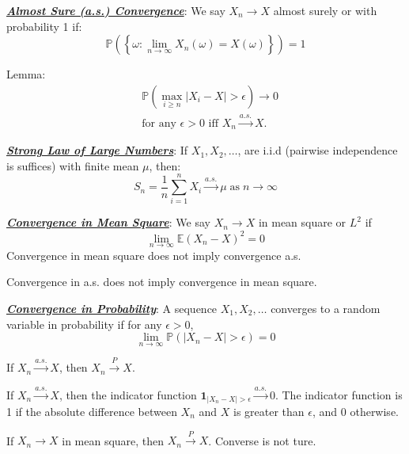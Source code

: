 \documentclass[12pt]{article}
\newcommand{\bulletPoint}[1]{\ul{\textit{\textbf{#1}}}}
\begin{document}
\begin{multicols*}{4}
\bulletPoint{Almost Sure (a.s.) Convergence}:
We say $X_n \rightarrow X$ almost surely or with probability 1 if:
\useshortskip \begin{equation*}
    \mathbb{P} \left( \left\{\omega: \lim_{n \rightarrow \infty}X_n(\omega) = X(\omega) \right\}  \right) = 1
\end{equation*}

Lemma:
\useshortskip \begin{equation*}
    \begin{split}
        & \mathbb{P} \left( \max_{i\geq n} |X_i - X| > \epsilon \right) \rightarrow 0 \\[-4pt]
        & \text{for any $\epsilon >0$ iff $X_n \xrightarrow{a.s.} X.$}
    \end{split}
\end{equation*}


\bulletPoint{Strong Law of Large Numbers}:
If $X_1, X_2, \ldots$, are i.i.d (pairwise independence is suffices) with finite mean $\mu$, then:
\useshortskip \begin{equation*}
    S_n = \frac{1}{n}\sum^n_{i=1}X_i\xrightarrow{a.s.}\mu \; \text{as} \; n \rightarrow \infty
\end{equation*}


\bulletPoint{Convergence in Mean Square}:
We say $X_n \rightarrow X$ in mean square or $L^2$ if
\useshortskip \begin{equation*}
    \lim_{n \rightarrow \infty} \mathbb{E}(X_n-X)^2 = 0
\end{equation*}
Convergence in mean square does not imply convergence a.s.

Convergence in a.s. does not imply convergence in mean square.

\bulletPoint{Convergence in Probability}:
A sequence $X_1, X_2, \ldots$ converges to a random variable in probability if for any $\epsilon > 0$, 
\useshortskip \begin{equation*}
    \lim_{n \rightarrow \infty}\mathbb{P}(|X_n-X|>\epsilon)=0 
\end{equation*}

If $X_n \xrightarrow{a.s.} X$, then $X_n \xrightarrow{P} X$.

If $X_n \xrightarrow{a.s.} X$, then the indicator function $\mathbf{1}_{|X_n-X|>\epsilon} \xrightarrow{a.s.} 0$. The indicator function is 1 if the absolute difference between $X_n$ and $X$ is greater than $\epsilon$, and 0 otherwise.

If $X_n \rightarrow X$ in mean square, then $X_n \xrightarrow{P} X$. Converse is not ture.


\end{multicols*}
\end{document}
